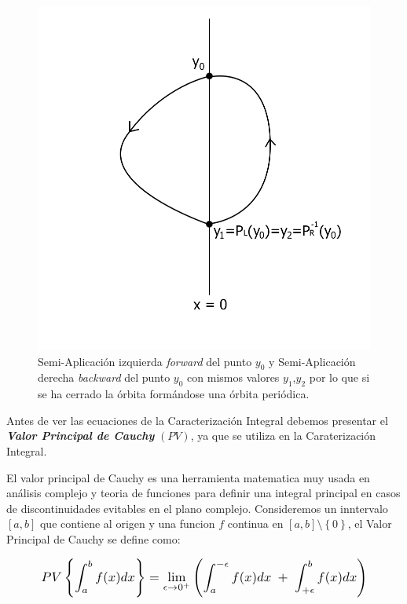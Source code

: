 \documentclass[12pt,a4paper]{report} %
\begin{document}
	\begin{figure}[h]
		\centering
		\includegraphics[width=1\textwidth]{aplipoincareL-Rcerrado.jpg}
		\caption{Semi-Aplicación izquierda \textit{forward} del punto $y_0$ y Semi-Aplicación derecha \textit{backward} del punto $y_0$ con mismos valores $y_1$,$y_2$ por lo que si se ha cerrado la órbita formándose una órbita periódica.}
		\label{fig:aplipoincareL-Rcerrado}
	\end{figure}\smallskip
	
	\newpage 
		
	\vspace{0.5cm} Antes de ver las ecuaciones de la Caracterización Integral debemos presentar el \textit{\textbf{Valor Principal de Cauchy}} $\left(PV\right)$, ya que se utiliza en la Caraterización Integral.
	
	\vspace{0.5cm}\noindent El valor principal de Cauchy es una herramienta matematica muy usada en análisis complejo y teoria de funciones para definir una integral principal en casos de discontinuidades evitables en el plano complejo. Consideremos un inntervalo $[a,b]$ que contiene al origen y una funcion $f$ continua en $[a,b] \setminus \left\{0\right\}$, el Valor Principal de Cauchy se define como:

	\begin{equation}
		\scalebox{1.2}{$\displaystyle
		 PV\left\{\int_{a}^{b}f(x)dx\right\}= \lim_{\epsilon \to 0^+}\left(
		\int_{a}^{-\epsilon}f(x)dx \; + \; 
		\int_{+\epsilon}^{b}f(x)dx
		\right)
		$}
	\end{equation}\smallskip
	
\end{document}
